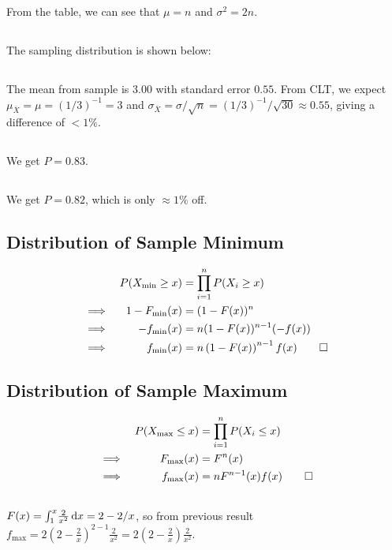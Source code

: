 \documentclass[twocolumn]{article}
\newcommand{\fmin}{f_{\text{min}}}
\newcommand{\Fmin}{F_{\text{min}}}
\newcommand{\fmax}{f_{\text{max}}}
\newcommand{\Fmax}{F_\text{max}}
\begin{document}
From the table, we can see that $\mu=n$ and $\sigma^2=2n$.

\subsection{}
The sampling distribution is shown below:
\subsection{}
The mean from sample is $3.00$ with standard error $0.55$.
From CLT, we expect $\mu_{\overline{X}}=\mu=(1/3)^{-1}=3$ and $\sigma_{\overline{X}}=\sigma/\sqrt{n}=(1/3)^{-1}/\sqrt{30}\approx 0.55$, giving a difference of $<1\%$.
\subsection{}
We get $P=0.83$.
\subsection{}
We get $P=0.82$, which is only $\approx 1\%$ off.


\subsection{Distribution of Sample Minimum}
\begin{align*}
&&P(X_{\text{min}} \ge x) &= \prod_{i=1}^n P(X_i \ge x) \\
&\implies& 1-\Fmin(x) &= (1-F(x))^n\\
&\implies& -\fmin(x) &= n(1-F(x))^{n-1} (-f(x))\\
&\implies& \fmin(x) &= n\left(1-F(x)\right)^{n-1}f(x) \qed
\end{align*}
\subsection{Distribution of Sample Maximum}
\begin{align*}
&&P(X_{\text{max}} \le x) &= \prod_{i=1}^n P(X_i \le x) \\
&\implies& \Fmax(x) &= F^n(x)\\
&\implies& \fmax(x) &= nF^{n-1}(x)f(x) \qed
\end{align*}

\subsection{}
$F(x)=\int_{1}^{x} \! \frac{2}{x^2} \, \mathrm{d} x=2-2/x$, so from previous result $\fmax=2\left(2-\frac{2}{x}\right)^{2-1}\frac{2}{x^2}=2\left(2-\frac{2}{x}\right)\frac{2}{x^2}$.
\end{document}
